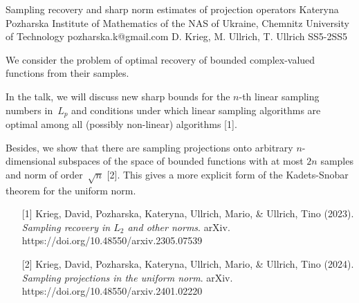 \begin{talk}
  {Sampling recovery and sharp norm estimates of projection operators}%
  {Kateryna Pozharska}%
  {Institute of Mathematics of the NAS of Ukraine, 
  Chemnitz University of Technology}%
  {pozharska.k@gmail.com}%
  {D. Krieg, M. Ullrich, T. Ullrich}%
{}{}{SS5-2}{SS5}

			

We consider the problem of optimal recovery of bounded complex-valued functions 
from their samples. 

In the talk, we will discuss new sharp bounds for the $n$-th linear sampling numbers in~$L_p$ and conditions under which linear sampling algorithms are optimal among all  (possibly non-linear) algorithms [1].

Besides, we show that there are sampling projections onto arbitrary 
$n$-dimensional subspaces of the space of bounded functions
with at most $2n$ samples and norm of order~$\sqrt{n}$ [2].
This gives a more explicit form of the Kadets-Snobar theorem for the uniform norm.



\medskip


\begin{enumerate}
\item[{[1]}] Krieg, David, Pozharska, Kateryna, Ullrich, Mario, \& Ullrich, Tino (2023). {\it Sampling recovery in $L_2$ and other norms}. arXiv. 
 https://doi.org/10.48550/arxiv.2305.07539
 
 \item[{[2]}] Krieg, David, Pozharska, Kateryna, Ullrich, Mario, \& Ullrich, Tino (2024). {\it Sampling projections in the uniform norm}. arXiv. 
  https://doi.org/10.48550/arxiv.2401.02220
 
\end{enumerate}


\end{talk}

